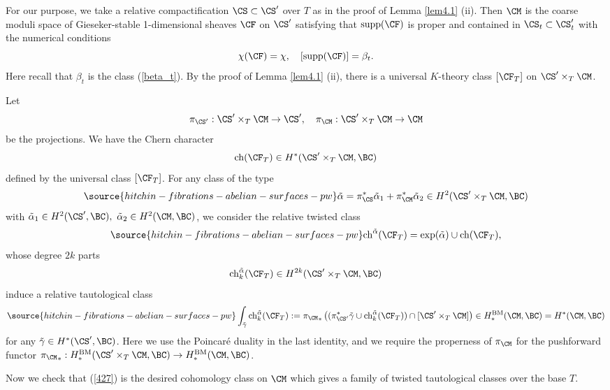 For our purpose, we take a relative compactification $\CS \subset \CS'$ over $T$ as in the proof of Lemma \ref{lem4.1} (ii). Then $\CM$ is the {coarse} moduli space of Gieseker-stable 1-dimensional sheaves $\CF$ on $\CS'$ satisfying that $\mathrm{supp}(\CF)$ is proper and contained in $\CS_t \subset \CS_t'$ with the numerical conditions
\[
\chi(\CF) = \chi, \quad [\mathrm{supp}(\CF)] = \beta_t.
\]
Here recall that $\beta_t$ is the class (\ref{beta_t}). By the proof of Lemma \ref{lem4.1} (ii), there is a universal $K$-theory class $[\CF_T]$ on $\CS' \times_T \CM$.

Let
\[
\pi_{\CS'}: \CS' \times_T \CM \to \CS', \quad \pi_\CM: \CS' \times_T \CM \to \CM
\]
be the projections. We have the Chern character
\[
\mathrm{ch}({\CF_T}) \in H^*(\CS' \times_T \CM, \BC)
\]
defined by the universal class $[\CF_T]$. For any class of the type
\begin{equation}\label{alphatilde}
\source{hitchin-fibrations-abelian-surfaces-pw}
\tilde{\alpha} = \pi_\CS^* \tilde{\alpha}_1 + \pi_\CM^* \tilde{\alpha}_2 \in H^2(\CS' \times_T \CM, \BC)
\end{equation}
with $\tilde{\alpha}_1\in H^2(\CS', \BC),~ \tilde{\alpha}_2\in H^2(\CM, \BC)$, we consider the relative twisted class
\begin{equation}\label{456}
\source{hitchin-fibrations-abelian-surfaces-pw}
\mathrm{ch}^{\tilde{\alpha}}(\CF_T) = \mathrm{exp}(\tilde{\alpha})\cup \mathrm{ch}(\CF_T),
\end{equation}
whose degree $2k$ parts
\[
 \mathrm{ch}_k^{\tilde{\alpha}}(\CF_T) \in H^{2k}(\CS' \times_T \CM, \BC)
\]
induce a relative tautological class
\begin{equation}\label{427}
\source{hitchin-fibrations-abelian-surfaces-pw}
\int_{\tilde{\gamma}} \mathrm{ch}_k^{\tilde{\alpha}}(\CF_T): = {\pi_\CM}_* \left( (\pi_{\CS'}^*\tilde{\gamma} \cup  \mathrm{ch}_k^{\tilde{\alpha}}(\CF_T))\cap [\CS' \times_T \CM] \right) \in H_*^\mathrm{BM}(\CM,\BC) =H^*(\CM, \BC)
\end{equation}
for any $\tilde{\gamma}\in H^*(\CS', \BC)$. Here we use the Poincar\'e duality in the last identity, and we require the properness of $\pi_\CM$ for the pushforward functor ${\pi_\CM}_* : H^{\mathrm{BM}}_*(\CS' \times_T \CM, \BC) \to H^{\mathrm{BM}}_*(\CM, \BC)$.

Now we check that (\ref{427}) is the desired cohomology class on $\CM$ which gives a family of twisted tautological classes over the base $T$.


